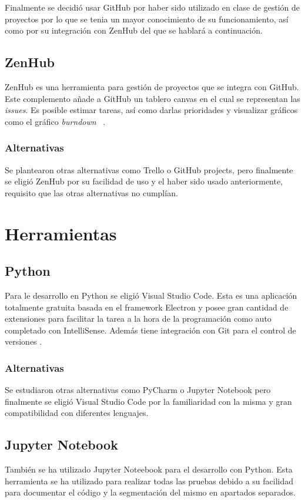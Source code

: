 Finalmente se decidió usar GitHub por haber sido utilizado en clase de gestión de proyectos por lo que se tenia un mayor conocimiento de su funcionamiento, así como por su integración con ZenHub del que se hablará a continuación.

\subsection{ZenHub}\label{ZenHub}
ZenHub es una herramienta para gestión de proyectos que se integra con GitHub. Este complemento añade a GitHub un tablero canvas en el cual se representan las \emph{issues}. Es posible estimar tareas, así como darlas prioridades y visualizar gráficos como el gráfico \emph{burndown}~ \cite{zenhub}.

\subsubsection{Alternativas}\label{AlternativasZotero}
Se plantearon otras alternativas como Trello o GitHub projects, pero finalmente se eligió  ZenHub por su facilidad de uso y el haber sido usado anteriormente, requisito que las otras alternativas no cumplían.

\section{Herramientas}

	\subsection{Python}\label{Python}
Para le desarrollo en Python se eligió Visual Studio Code. Esta es una aplicación totalmente gratuita basada en el framework Electron y posee gran cantidad de extensiones para facilitar la tarea a la hora de la programación como auto completado con IntelliSense. Además tiene integración con Git para el control de versiones \cite{wiki:vscode_wiki,vscode}.
		\subsubsection{Alternativas}\label{AlternativasIDE}
Se estudiaron otras alternativas como PyCharm o Jupyter Notebook pero finalmente se eligió Visual Studio Code por la familiaridad con la misma y gran compatibilidad con diferentes lenguajes.

	\subsection{Jupyter Notebook}\label{jupyterNotebook}
También se ha utilizado Jupyter Noteebook para el desarrollo con Python. Esta herramienta se ha utilizado para realizar todas las pruebas debido a su facilidad para documentar el código y la segmentación del mismo en apartados separados. 

